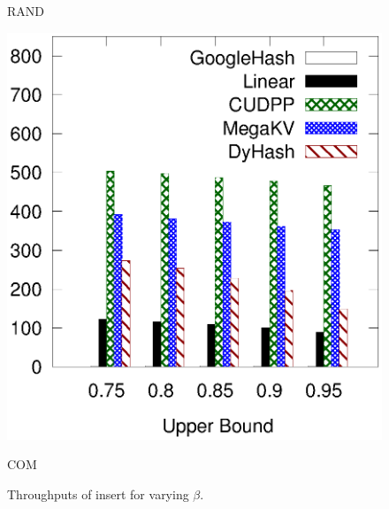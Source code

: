 \begin{figure}[t]
\begin{minipage}{0.19\linewidth}
		\centerline{RAND}
	\end{minipage}
	\hfill
	\begin{minipage}{0.19\linewidth}\centering
		\includegraphics[width=\linewidth]{pic/static-upper/upper_insert_ali.eps}
		\centerline{COM}
	\end{minipage}
	\caption{Throughputs of insert for varying $\beta$.}
	\label{fig:static:all:insert}
\end{figure}
